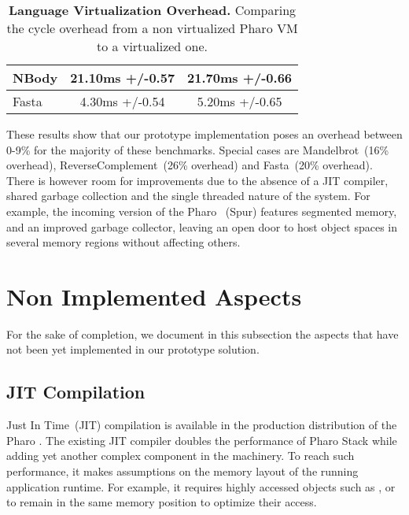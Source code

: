 \begin{table}[ht]
\begin{tabular}{|l|c|c|}
		NBody & 21.10ms +/-0.57 & 21.70ms +/-0.66 \\\hline%
		Fasta & 4.30ms +/-0.54 & 5.20ms +/-0.65 \\\hline%
 	\end{tabular}
	\vspace*{0.2cm}
 	\caption{\small\textbf{Language Virtualization Overhead.} Comparing the cycle overhead from a non virtualized Pharo VM to a virtualized one.\label{tb:benchmarks}}
 \end{table}

These results show that our prototype implementation poses an overhead between 0-9\% for the majority of these benchmarks. Special cases are Mandelbrot~(16\% overhead), ReverseComplement~(26\% overhead) and Fasta~(20\% overhead).
There is however room for improvements due to the absence of a JIT compiler, shared garbage collection and the single threaded nature of the system.
For example, the incoming version of the Pharo \VM~(Spur) features segmented memory, and an improved garbage collector, leaving an open door to host object spaces in several memory regions without affecting others. 


\section{Non Implemented Aspects} \label{sec:not_yet_implemented}
 
For the sake of completion, we document in this subsection the aspects that have not been yet implemented in our prototype solution.

\subsection{JIT Compilation}

Just In Time~(JIT) compilation is available in the production distribution of the Pharo \VM. The existing JIT compiler doubles the performance of Pharo Stack \VM while adding yet another complex component in the \VM machinery. To reach such performance, it makes assumptions on the memory layout of the running application runtime. For example, it requires highly accessed objects such as ,  or  to remain in the same memory position to optimize their access.

